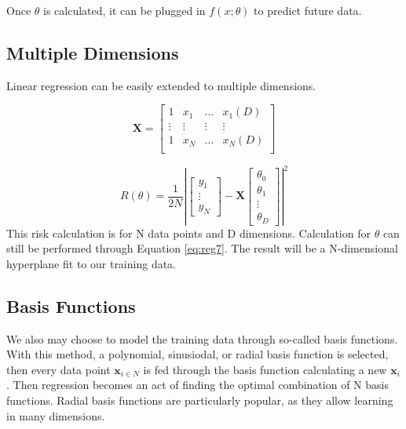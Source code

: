 \documentclass{ecctd01} %
\begin{document}
Once $\theta$ is calculated, it can be plugged in $f(x;\theta)$
to predict future data.

\subsection{Multiple Dimensions }
Linear regression can be easily extended to multiple dimensions. 

\begin{displaymath}
  \mathbf{X} = 
  \left[ \begin{array}{cccc}
      1 & x_{1} & \hdots & x_{1}(D) \\
      \vdots & \vdots & \vdots & \vdots \\
      1 & x_{N} & \hdots & x_{N}(D) \\
  \end{array} \right] 
\end{displaymath}

\begin{displaymath}
  \label{eq:reg8}  
  R\left(\theta\right) = \frac{1}{2N}
  \left|
  \left[ \begin{array}{c}
      y_{1} \\
      \vdots \\
      y_{N}
  \end{array} \right]
  -
  \mathbf{X}
  \left[ \begin{array}{c}
      \theta_{0} \\
      \theta_{1} \\
      \vdots \\
      \theta_{D} 
  \end{array} \right]
  \right|^2 
\end{displaymath}
This risk calculation is for N data points and D
dimensions. Calculation for $\theta$ can still be performed through
Equation \eqref{eq:reg7}. The result will be a N-dimensional
hyperplane fit to our training data.  

\subsection{Basis Functions}
We also may choose to model the training data through so-called basis
functions. With this method, a polynomial, sinusiodal, or radial basis
function is selected, then every data point $\mathbf{x}_{i\in N}$ is
fed through the basis function calculating a new $\mathbf{x}_{i}$. Then
regression becomes an act of finding the optimal combination of N
basis functions. Radial basis functions are particularly popular, as
they allow learning in many dimensions.  
\end{document}

